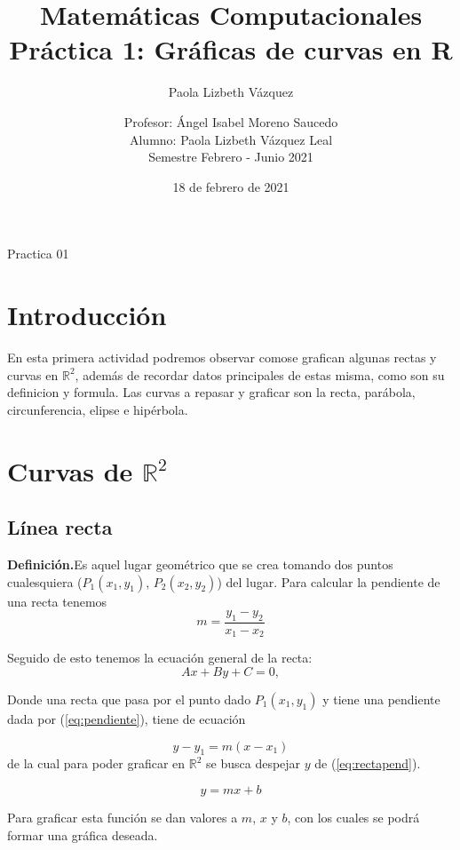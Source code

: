 \documentclass[12pt,a4paper]{report}
\author{ Paola Lizbeth Vázquez}
\title{Matemáticas Computacionales \\ Práctica 1: Gráficas de curvas en R} %
\author{Profesor: Ángel Isabel Moreno Saucedo \\ Alumno: Paola Lizbeth Vázquez Leal \\ Semestre Febrero - Junio 2021} %
\date{18 de febrero de 2021}
\begin{document}
\maketitle %
Practica 01
\section{Introducción}
En esta primera actividad podremos observar comose grafican algunas rectas y curvas en $\mathbb{R}^2$, además de recordar datos principales de estas misma, como son su definicion y formula. Las curvas a repasar y graficar son la recta, parábola, circunferencia, elipse e hipérbola.


\section{Curvas de $\mathbb{R}^2$} 

\subsection{Línea recta} \label{subsec:linearecta}

\textbf{Definición.}Es aquel lugar geométrico que se crea tomando dos puntos cualesquiera ($P_1(x_1, y_1)$, $P_2(x_2, y_2)$) del lugar.  Para calcular la pendiente de una recta tenemos 
\begin{equation}
m = \frac{y_1-y_2}{x_1-x_2} \label{eq:pendiente}
\end{equation}

Seguido de esto tenemos la ecuación general de la recta:
\begin{equation}
Ax + By + C = 0, \label{eq:recta}
\end{equation}

Donde una recta que pasa por el punto dado $P_1(x_1,y_1)$ y tiene una pendiente dada por (\ref{eq:pendiente}), tiene de ecuación

\begin{equation}
y-y_1=m(x-x_1) \label{eq:rectapend}
\end{equation}
 de la cual para poder  graficar en $\mathbb{R}^2$ se busca despejar $y$ de (\ref{eq:rectapend}).
 
\begin{equation}
y = mx + b \label{eq:pendienteinterseccion}
\end{equation}

Para graficar esta función se dan valores a $m$, $x$ y $b$, con los cuales se podrá formar una gráfica deseada. 
\end{document}
